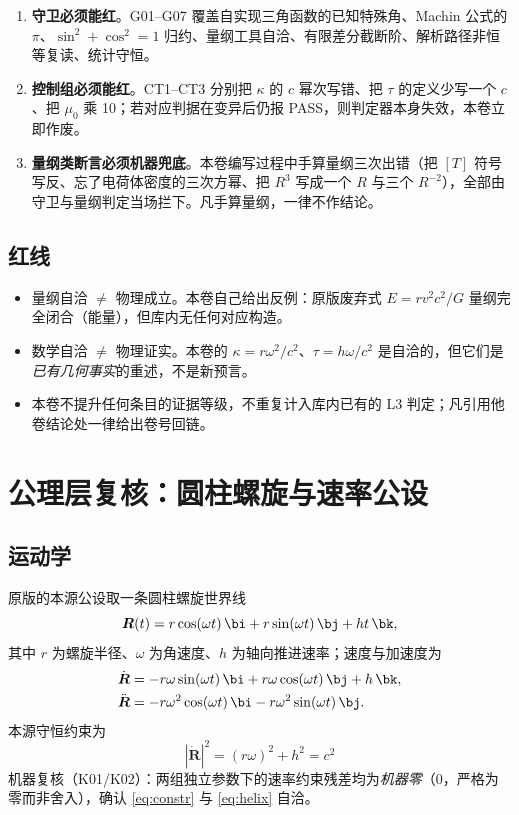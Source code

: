 \documentclass[UTF8,fontset=fandol,11pt]{ctexart}
\newcommand{\bx}{\boldsymbol}
\begin{document}
\begin{enumerate}
  \item \textbf{守卫必须能红}。G01--G07 覆盖自实现三角函数的已知特殊角、Machin 公式的 $\pi$、$\sin^2+\cos^2=1$ 归约、量纲工具自洽、有限差分截断阶、解析路径非恒等复读、统计守恒。
  \item \textbf{控制组必须能红}。CT1--CT3 分别把 $\kappa$ 的 $c$ 幂次写错、把 $\tau$ 的定义少写一个 $c$、把 $\mu_0$ 乘 10；若对应判据在变异后仍报 PASS，则判定器本身失效，本卷立即作废。
  \item \textbf{量纲类断言必须机器兜底}。本卷编写过程中手算量纲三次出错（把 $[T]$ 符号写反、忘了电荷体密度的三次方幂、把 $R^3$ 写成一个 $R$ 与三个 $R^{-2}$），全部由守卫与量纲判定当场拦下。凡手算量纲，一律不作结论。
\end{enumerate}

\subsection{红线}
\begin{itemize}
  \item 量纲自洽 $\neq$ 物理成立。本卷自己给出反例：原版废弃式 $E=r v^2 c^2/G$ 量纲完全闭合（能量），但库内无任何对应构造。
  \item 数学自洽 $\neq$ 物理证实。本卷的 $\kappa=r\omega^2/c^2$、$\tau=h\omega/c^2$ 是自洽的，但它们是\emph{已有几何事实}的重述，不是新预言。
  \item 本卷不提升任何条目的证据等级，不重复计入库内已有的 L3 判定；凡引用他卷结论处一律给出卷号回链。
\end{itemize}

\section{公理层复核：圆柱螺旋与速率公设}
\label{sec:axiom}

\subsection{运动学}
原版的本源公设取一条圆柱螺旋世界线
\begin{equation}
  \bx R(t)=r\cos(\omega t)\,\bi+r\sin(\omega t)\,\bj+ht\,\bk ,
  \label{eq:helix}
\end{equation}
其中 $r$ 为螺旋半径、$\omega$ 为角速度、$h$ 为轴向推进速率；速度与加速度为
\begin{align}
  \dot{\bx R}&=-r\omega\sin(\omega t)\,\bi+r\omega\cos(\omega t)\,\bj+h\,\bk ,\\
  \ddot{\bx R}&=-r\omega^2\cos(\omega t)\,\bi-r\omega^2\sin(\omega t)\,\bj .
\end{align}
本源守恒约束为
\begin{equation}
  \boxed{\,|\dot{\bx R}|^2=(r\omega)^2+h^2=c^2\,}
  \label{eq:constr}
\end{equation}
机器复核（K01/K02）：两组独立参数下的速率约束残差均为\emph{机器零}（$0$，严格为零而非舍入），确认 \eqref{eq:constr} 与 \eqref{eq:helix} 自洽。
\end{document}
